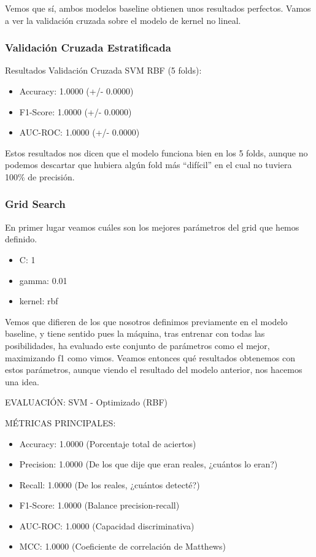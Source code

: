 Vemos que sí, ambos modelos baseline obtienen unos resultados perfectos. Vamos a ver la validación cruzada sobre el modelo de kernel no lineal.

\subsubsection*{Validación Cruzada Estratificada}

Resultados Validación Cruzada SVM RBF (5 folds):
\begin{itemize}
	\item Accuracy: 1.0000 (+/- 0.0000)
	\item F1-Score: 1.0000 (+/- 0.0000)
	\item AUC-ROC:  1.0000 (+/- 0.0000)
\end{itemize}
   
Estos resultados nos dicen que el modelo funciona bien en los 5 folds, aunque no podemos descartar que hubiera algún fold más ``difícil'' en el cual no tuviera 100\% de precisión.

\subsubsection*{Grid Search}

En primer lugar veamos cuáles son los mejores parámetros del grid que hemos definido.

\begin{itemize}
	\item C: 1
	\item gamma: 0.01
	\item kernel: rbf
\end{itemize}

Vemos que difieren de los que nosotros definimos previamente en el modelo baseline, y tiene sentido pues la máquina, tras entrenar con todas las posibilidades, ha evaluado este conjunto de parámetros como el mejor, maximizando f1 como vimos. Veamos entonces qué resultados obtenemos con estos parámetros, aunque viendo el resultado del modelo anterior, nos hacemos una idea.

EVALUACIÓN: SVM - Optimizado (RBF)

MÉTRICAS PRINCIPALES:
\begin{itemize}
	\item Accuracy:  1.0000  (Porcentaje total de aciertos)
	\item Precision: 1.0000  (De los que dije que eran reales, ¿cuántos lo eran?)
	\item Recall:    1.0000  (De los reales, ¿cuántos detecté?)
	\item F1-Score:  1.0000  (Balance precision-recall)
	\item AUC-ROC:   1.0000  (Capacidad discriminativa)
	\item MCC:       1.0000  (Coeficiente de correlación de Matthews)
\end{itemize}

